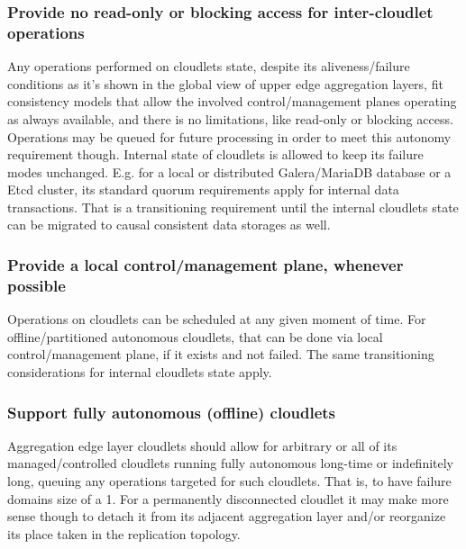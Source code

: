 \documentclass[conference]{IEEEtran}
\begin{document}
\subsubsection{Provide no read-only or blocking access for inter-cloudlet
operations}
Any operations performed on cloudlets state, despite its aliveness/failure
conditions as it's shown in the global view of upper edge aggregation layers,
fit consistency models that allow the involved control/management planes
operating as always available, and there is no limitations, like read-only or
blocking access. Operations may be queued for future processing in order to
meet this autonomy requirement though. Internal state of cloudlets is allowed
to keep its failure modes unchanged. E.g. for a local or distributed
Galera/MariaDB database or a Etcd cluster, its standard quorum requirements
apply for internal data transactions. That is a transitioning requirement until
the internal cloudlets state can be migrated to causal consistent data storages
as well.

\subsubsection{Provide a local control/management plane, whenever possible}
Operations on cloudlets can be scheduled at any given moment of time. For
offline/partitioned autonomous cloudlets, that can be done via local
control/management plane, if it exists and not failed. The same transitioning
considerations for internal cloudlets state apply.

\subsubsection{Support fully autonomous (offline) cloudlets}
Aggregation edge layer cloudlets should allow for arbitrary or all of its
managed/controlled cloudlets running fully autonomous long-time or indefinitely
long, queuing any operations targeted for such cloudlets. That is, to have
failure domains size of a 1. For a permanently disconnected cloudlet it may make
more sense though to detach it from its adjacent aggregation layer and/or
reorganize its place taken in the replication topology.
\end{document}
